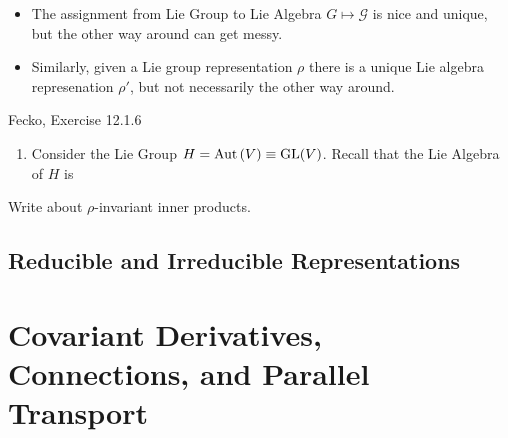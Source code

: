 \documentclass[11pt]{article}
\begin{document}
\vskip 0.5cm
\begin{itemize}
  \item The assignment from Lie Group to Lie Algebra $G \mapsto \mathcal{G}$ is nice and unique, but the other way around can get messy.
  \item Similarly, given a Lie group representation $\rho$ there is a unique Lie algebra represenation $\rho'$, but not necessarily the other way around. 
\end{itemize}


\begin{ex}{Fecko, Exercise 12.1.6}
  \begin{enumerate}[label=(\roman*)]
    \item Consider the Lie Group $H = \mathrm{Aut}\left(V\right) \equiv \mathrm{GL}(V)$. 
    Recall that the Lie Algebra of $H$ is 
  \end{enumerate}
\end{ex}

\vskip 0.5cm
Write about $\rho$-invariant inner products.

\vskip 1cm
\subsection{Reducible and Irreducible Representations}




\vskip 1cm


\newpage
\section{Covariant Derivatives, Connections, and Parallel Transport}
\end{document}
